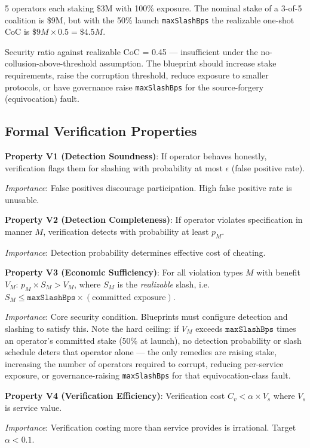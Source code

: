 \documentclass[11pt,a4paper]{article}
\begin{document}
5 operators each staking \$3M with 100\% exposure. The nominal stake of a 3-of-5 coalition is \$9M, but with the 50\% launch \texttt{maxSlashBps} the realizable one-shot CoC is $\$9M \times 0.5 = \$4.5M$.

Security ratio against realizable CoC = 0.45 --- insufficient under the no-collusion-above-threshold assumption. The blueprint should increase stake requirements, raise the corruption threshold, reduce exposure to smaller protocols, or have governance raise \texttt{maxSlashBps} for the source-forgery (equivocation) fault.

\subsection{Formal Verification Properties}

\textbf{Property V1 (Detection Soundness)}: If operator behaves honestly, verification flags them for slashing with probability at most $\epsilon$ (false positive rate).

\textit{Importance}: False positives discourage participation. High false positive rate is unusable.

\textbf{Property V2 (Detection Completeness)}: If operator violates specification in manner $M$, verification detects with probability at least $p_M$.

\textit{Importance}: Detection probability determines effective cost of cheating.

\textbf{Property V3 (Economic Sufficiency)}: For all violation types $M$ with benefit $V_M$: $p_M \times S_M > V_M$, where $S_M$ is the \emph{realizable} slash, i.e. $S_M \le \texttt{maxSlashBps} \times (\text{committed exposure})$.

\textit{Importance}: Core security condition. Blueprints must configure detection and slashing to satisfy this. Note the hard ceiling: if $V_M$ exceeds $\texttt{maxSlashBps}$ times an operator's committed stake (50\% at launch), no detection probability or slash schedule deters that operator alone --- the only remedies are raising stake, increasing the number of operators required to corrupt, reducing per-service exposure, or governance-raising \texttt{maxSlashBps} for that equivocation-class fault.

\textbf{Property V4 (Verification Efficiency)}: Verification cost $C_v < \alpha \times V_s$ where $V_s$ is service value.

\textit{Importance}: Verification costing more than service provides is irrational. Target $\alpha < 0.1$.
\end{document}
